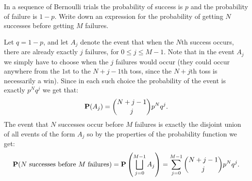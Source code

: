 \documentclass[11pt,a4paper]{article}
\begin{document}
\begin{exercise}
  In a sequence of Bernoulli trials the probability of success is $p$ and the
  probability of failure is $1 - p$.
  Write down an expression for the probability of getting $N$ successes
  before getting $M$ failures.
\end{exercise}
\begin{solution}
  Let $q = 1 - p$, and let $A_j$ denote the event that when the $N$th success
  occurs, there are already exactly $j$ failures,
  for $0 \le j \le M-1$.
  Note that in the event $A_j$ we simply have to choose when the $j$
  failures would occur (they could occur anywhere from the $1$st to the
  $N + j - 1$th toss, since the $N + j$th toss is necessarily a win).
  Since in each such choice the probability of the event is exactly
  $p^{N} q^j$ we get that:
  \[
    \mathbf{P}(A_j) =
    \binom{N + j - 1}{j} p^N q^j.
  \]
  The event that $N$ successes occur before $M$ failures is
  exactly the disjoint union of all events of the form $A_j$
  so by the properties of the probability function we get:
  \[
    \Prob(\text{$N$ successes before $M$ failures}) =
    \Prob\del{\bigsqcup_{j=0}^{M-1} A_j} =
    \sum_{j=0}^{M-1} \binom{N + j - 1}{j} p^N q^j.
  \]
\end{solution}
\end{document}

